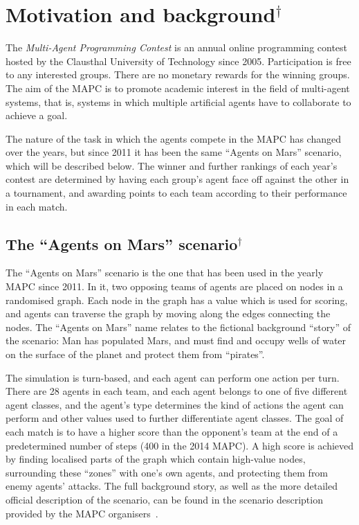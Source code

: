 \section{Motivation and background$^\dagger$}
The \emph{Multi-Agent Programming Contest} is an annual online programming contest hosted by the Clausthal University of Technology since 2005.
Participation is free to any interested groups.
There are no monetary rewards for the winning groups.
The aim of the MAPC is to promote academic interest in the field  of multi-agent systems, that is, systems in which multiple artificial agents have to collaborate to achieve a goal.

The nature of the task in which the agents compete in the MAPC has changed over the years, but since 2011 it has been the same \enquote{Agents on Mars} scenario, which will be described below.
The winner and further rankings of each year's contest are determined by having each group's agent face off against the other in a tournament, and awarding points to each team according to their performance in each match.

\subsection{The \enquote{Agents on Mars} scenario$^\dagger$}
The \enquote{Agents on Mars} scenario is the one that has been used in the yearly MAPC since 2011.
In it, two opposing teams of agents are placed on nodes in a randomised graph.
Each node in the graph has a value which is used for scoring, and agents can traverse the graph by moving along the edges connecting the nodes.
The \enquote{Agents on Mars} name relates to the fictional background \enquote{story} of the scenario: Man has populated Mars, and must find and occupy wells of water on the surface of the planet and protect them from \enquote{pirates}.

The simulation is turn-based, and each agent can perform one action per turn.
There are 28 agents in each team, and each agent belongs to one of five different agent classes, and the agent's type determines the kind of actions the agent can perform and other values used to further differentiate agent classes.
The goal of each match is to have a higher score than the opponent's team at the end of a predetermined number of steps (400 in the 2014 MAPC).
A high score is achieved by finding localised parts of the graph which contain high-value nodes, surrounding these \enquote{zones} with one's own agents, and protecting them from enemy agents' attacks.
The full background story, as well as the more detailed official description of the scenario, can be found in the scenario description provided by the MAPC organisers~\cite{ahlbrecht_mapc_2014}.


